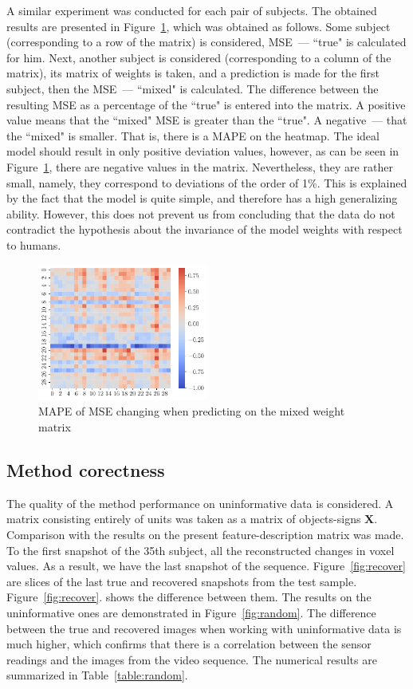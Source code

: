 \documentclass[sn-mathphys-num]{sn-jnl}%
\newcommand{\myfigref}[2]{~\ref{#1}.\subref{#2}}%
\theoremstyle{thmstyleone}%
\theoremstyle{thmstyletwo}%
\theoremstyle{thmstylethree}%
\begin{document}
A similar experiment was conducted for each pair of subjects.
The obtained results are presented in Figure~\ref{fig:heatmap},
which was obtained as follows.
Some subject (corresponding to a row of the matrix) is considered, 
MSE~--- ``true" is calculated for him.
Next, another subject is considered (corresponding to a column of the matrix),
its matrix of weights is taken, and a prediction is made for the first subject, then the MSE~--- ``mixed" is calculated. 
The difference between the resulting MSE as a percentage of the ``true" is entered into the matrix.
A positive value means that the ``mixed" MSE is greater than the ``true".
A negative~--- that the ``mixed" is smaller.
That is, there is a MAPE on the heatmap.
The ideal model should result in only positive deviation values, however, as can be seen in Figure~\ref{fig:heatmap}, there are negative values in the matrix.
Nevertheless, they are rather small, namely, they correspond to deviations of the order of 1\%.
This is explained by the fact that the model is quite simple, and therefore has a
high generalizing ability.
However, this does not prevent us from concluding that the data do not contradict the hypothesis 
about the invariance of the model weights with respect to humans.

\begin{figure}[h!]
	\centering
	\includegraphics[width=0.5\textwidth]{heatmap.pdf}
	\caption{MAPE of MSE changing when predicting on the mixed weight matrix}
	\label{fig:heatmap}
\end{figure}

\subsection{Method corectness}

The quality of the method performance on uninformative data is considered.
A matrix consisting entirely of units was taken as a matrix of objects-signs $\mathbf{X}$.
Comparison with the results on the present feature-description matrix was made.
To the first snapshot of the 35th subject, all the reconstructed
changes in voxel values.
As a result, we have the last snapshot of the sequence. Figure~\ref{fig:recover}
are slices of the last true and recovered snapshots from the test sample.
Figure\myfigref{fig:recover}{fig:recover-c} shows the difference between them.
The results on the uninformative ones are demonstrated in Figure~\ref{fig:random}.
The difference between the true and recovered images when working with uninformative data
is much higher, which confirms that there is a correlation between the sensor readings and the
images from the video sequence. The numerical results are summarized in Table~\ref{table:random}.
\end{document}
